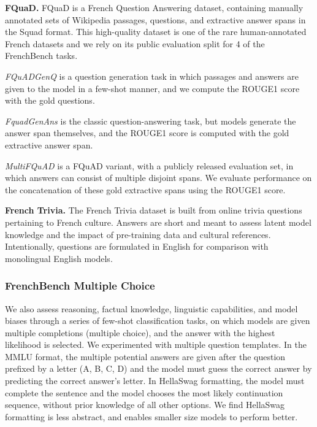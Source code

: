 \textbf{FQuaD.} FQuaD  is a French Question Answering dataset, containing manually annotated sets of Wikipedia passages, questions, and extractive answer spans in the Squad format. This high-quality dataset is one of the rare human-annotated French datasets and we rely on its public evaluation split for 4 of the FrenchBench tasks. 

\textit{FQuADGenQ} is a question generation task in which passages and answers are given to the model in a few-shot manner, and we compute the ROUGE1 score  with the gold questions. 


\textit{FquadGenAns} is the classic question-answering task, but models generate the answer span themselves, and the ROUGE1 score is computed with the gold extractive answer span. 

\textit{MultiFQuAD}  is a FQuAD variant, with a publicly released evaluation set, in which answers can consist of multiple disjoint spans. We evaluate performance on the concatenation of these gold extractive spans using the ROUGE1 score.


\textbf{French Trivia.} The French Trivia dataset is built from online trivia questions pertaining to French culture. Answers are short and meant to assess latent model knowledge and the impact of pre-training data and cultural references. Intentionally, questions are formulated in English for comparison with monolingual English models.

\subsubsection{FrenchBench Multiple Choice}

We also assess reasoning, factual knowledge, linguistic capabilities, and model biases through a series of few-shot classification tasks, on which models are given multiple completions (multiple choice), and the answer with the highest likelihood is selected. We experimented with multiple question templates. In the MMLU format, the multiple potential answers are given after the question prefixed by a letter (A, B, C, D) and the model must guess the correct answer by predicting the correct answer's letter. In HellaSwag formatting, the model must complete the sentence and the model chooses the most likely continuation sequence, without prior knowledge of all other options. We find HellaSwag formatting is less abstract, and enables smaller size models to perform better.

